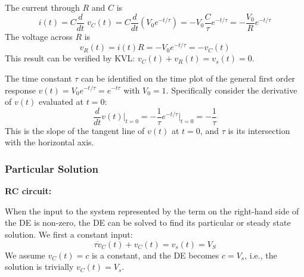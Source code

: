 \documentclass{article}
\begin{document}
The current through $R$ and $C$ is
\begin{equation}
  i(t)=C\frac{d}{dt}\;v_C(t)=C\frac{d}{dt}\left(V_0 e^{-t/\tau}\right)
  =-V_0 \frac{C}{\tau} e^{-t/\tau}=-\frac{V_0}{R} e^{-t/\tau}	
\end{equation}
The voltage across $R$ is 
\begin{equation}
  v_R(t)=i(t)R=-V_0 e^{-t/\tau}=-v_C(t)	
\end{equation}
This result can be verified by KVL: $v_C(t)+v_R(t)=v_s(t)=0$.

The time constant $\tau$ can be identified on the time plot of the general
first order response $v(t)=V_0 e^{-t/\tau}=e^{-t\tau}$ with $V_0=1$. Specifically
consider the derivative of $v(t)$ evaluated at $t=0$:
\begin{equation}
  \frac{d}{dt}v(t)\big|_{t=0}=-\frac{1}{\tau}e^{-t/\tau}\bigg|_{t=0}=-\frac{1}{\tau}
\end{equation}
This is the slope of the tangent line of $v(t)$ at $t=0$, and $\tau$ is its
intersection with the horizontal axis.



\subsubsection*{Particular Solution}

{\bf RC circuit:}

When the input to the system represented by the term on the right-hand 
side of the DE is non-zero, the DE can be solved to find its particular 
or steady state solution. We first a constant input:
\begin{equation}	
  \tau\dot{v}_C(t)+v_C(t)=v_s(t)=V_S
\end{equation}
We assume $v_C(t)=c$ is a constant, and the DE becomes $c=V_s$, i.e.,
the solution is trivially $v_C(t)=V_s$. 
\end{document}
